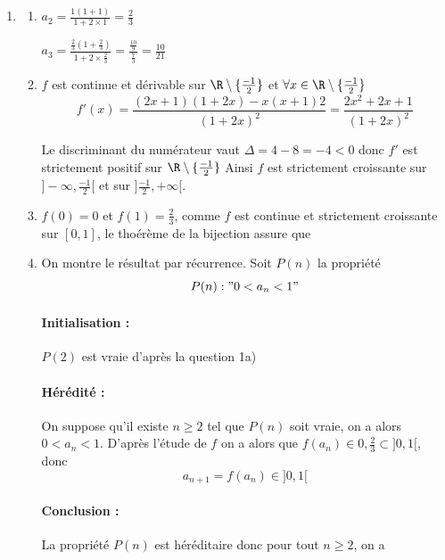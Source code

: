 \begin{correction}
\begin{enumerate}
\item \begin{enumerate}
\item $a_2 = \frac{1(1+1)}{1+2\times1}= \frac{2}{3}$

 $a_3 =  \frac{ \frac{2}{3}(1+ \frac{2}{3})}{1+2\times \frac{2}{3}}= \frac{ \frac{10}{9}}{\frac{7}{3}} = \frac{10}{21}$
 
 
\item $f$ est continue et dérivable sur $\R\setminus \{ \frac{-1}{2}\}$ et $\forall x\in  \R\setminus \{ \frac{-1}{2}\}$ 
$$ f'(x) = \frac{(2x+1)(1+2x) -x(x+1)2  }{(1+2x)^2 } = \frac{2x^2 +2x +1}{(1+2x)^2}$$

Le discriminant du numérateur vaut $\Delta = 4 - 8=-4<0$ donc $f'$ est strictement positif sur $\R\setminus \{ \frac{-1}{2}\}$
Ainsi $f$ est strictement croissante sur $]-\infty, \frac{-1}{2}[$ et sur $]\frac{-1}{2},+\infty[$.

\item  $f(0)=0$ et $f(1)=\frac{2}{3}$, comme $f$ est continue et strictement croissante sur $[0,1]$, le thoérème de la bijection assure que 
\conclusion{$f(]0,1[) = ]0,\frac{2}{3}[$}

\item On montre le résultat par récurrence. Soit $P(n)$ la propriété 
$$P(n): " 0<a_n<1"$$

\paragraph{Initialisation : }
$P(2)$ est vraie d'après la question 1a)

\paragraph{Hérédité : }
On suppose qu'il existe $n\geq 2$ tel que $P(n)$ soit vraie, on a alors $0<a_n <1$. D'après l'étude de $f$ on a alors que $f(a_n) \in 0,\frac{2}{3}
\subset ]0,1[$, donc 
$$a_{n+1} =f(a_n) \in ]0,1[$$

\paragraph{Conclusion : }
La propriété $P(n)$ est héréditaire donc pour tout $n\geq 2$, on  a 




\end{enumerate}
\end{enumerate}
\end{correction}
